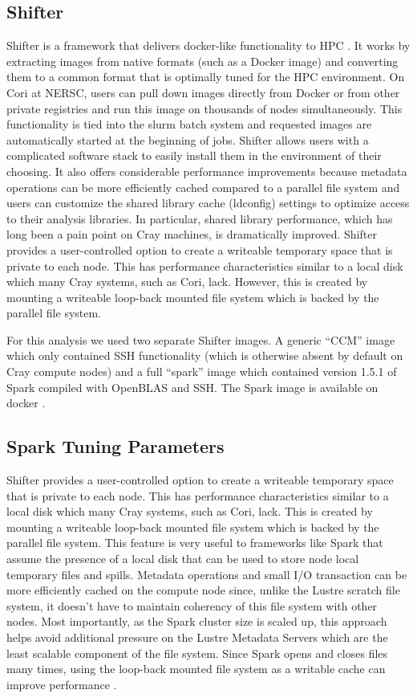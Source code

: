 \subsection{Shifter} \label{shiftersec}
Shifter is a framework that delivers docker-like functionality to HPC \cite{shifter}. It works by extracting images from native formats (such as a Docker image) and converting them to a common format that is optimally tuned for the HPC environment. On Cori at NERSC, users can pull down images directly from Docker or from other private registries and run this image on thousands of nodes simultaneously. This functionality is tied into the slurm batch system and requested images are automatically started at the beginning of jobs. Shifter allows users with a complicated software stack to easily install them in the environment of their choosing. It also offers considerable performance improvements because metadata operations can be more efficiently cached compared to a parallel file system and users can customize the shared library cache (ldconfig) settings to optimize access to their analysis libraries. In particular, shared library performance, which has long been a pain point on Cray machines, is dramatically improved.
Shifter provides a user-controlled option to create a writeable temporary space that is private to each node.  This has performance characteristics similar to a local disk which many Cray systems, such as Cori, lack.  However, this is created by mounting a writeable loop-back mounted file system which is backed by the parallel file system.

For this analysis we used two separate Shifter images. A generic “CCM” image which only contained SSH functionality (which is otherwise absent by default on Cray compute nodes) and a full “spark” image which contained version 1.5.1 of Spark  compiled with OpenBLAS \cite{openblas} and SSH. The Spark image is available on docker \cite{dockerspark}. 

\subsection{Spark Tuning Parameters}

Shifter provides a user-controlled option to create a writeable temporary space that is private to each node. This has performance characteristics similar to a local disk which many Cray systems, such as Cori, lack. This is created by mounting a writeable loop-back mounted file system which is backed by the parallel file system. This feature is very useful to frameworks like Spark that assume the presence of a local disk that can be used to store node local temporary files and spills. Metadata operations and small I/O transaction can  be more efficiently cached on the compute node since, unlike the Lustre scratch file system, it doesn't have to maintain coherency of this file system with other nodes. Most importantly, as the Spark cluster size is scaled up, this approach helps avoid additional pressure on the Lustre Metadata Servers which are the least scalable component of the file system. Since Spark opens and closes files many times, using the loop-back mounted file system as a writable cache can improve performance \cite{scalingspark16}.

